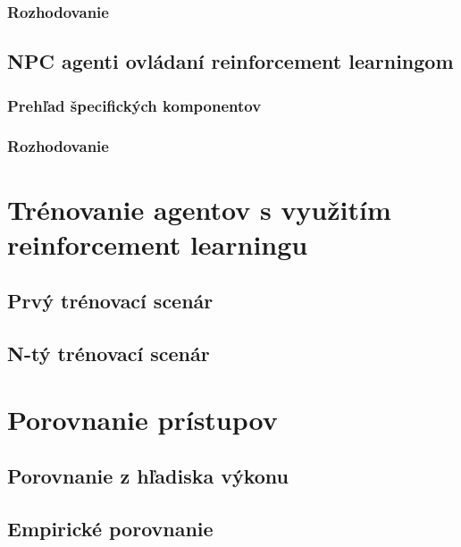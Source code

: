 \documentclass[slovak, master]{diploma}
\begin{document}
\subsection{Rozhodovanie}
\label{sec:ImplDecisionTrees}

\section{NPC agenti ovládaní reinforcement learningom}
\label{sec:AgentsWithBrain}
\subsection{Prehľad špecifických komponentov}
\label{secAgentsWithBrainComponentOverview} 

\subsection{Rozhodovanie}
\label{sec:ImplReinforcementLearningMLAgent}

\chapter{Trénovanie agentov s využitím reinforcement learningu}
\label{sec:Training}
\section{Prvý trénovací scenár}
\label{sec:FirstScenario}
\section{N-tý trénovací scenár}
\label{sec:LastScenario}

\chapter{Porovnanie prístupov}
\label{sec:ImplReinforcement learning}
\section{Porovnanie z hľadiska výkonu}
\label{sec:Performance}
\section{Empirické porovnanie}
\label{sec:Gameplay}
\end{document}
